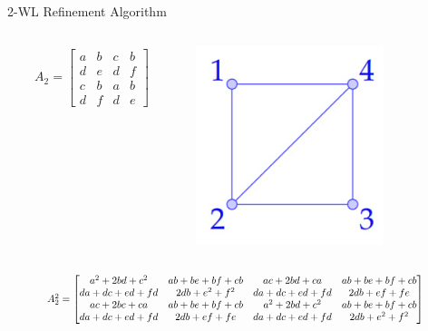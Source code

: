 \documentclass{beamer}
\begin{document}
\begin{frame}{2-WL Refinement Algorithm}
    \begin{columns}
        \begin{column}{0.7\textwidth}
        \begin{align*}
            A_2 = \begin{bmatrix}
                a&b&c&b\\
                d&e&d&f\\
                c&b&a&b\\
                d&f&d&e
            \end{bmatrix}
        \end{align*}
        \end{column}

        \begin{column}{0.3\textwidth}
            \centering
            \includegraphics[width=0.7\textwidth]{slides/pic_1.jpg}
        \end{column}
    \end{columns}
    
    \vspace{1em}
    \[
    \scalebox{0.8}{
    $
        A_2^2 = \begin{bmatrix}
            a^2+2bd+c^2 & ab+be+bf+cb&ac+2bd+ca & ab+be+bf+cb\\
            da+dc+ed+fd&2db+e^2+f^2&da+dc+ed+fd&2db+ef+fe\\
            ac+2bc+ca&ab+be+bf+cb&a^2+2bd+c^2&ab+be+bf+cb\\
            da+dc+ed+fd & 2db+ef+fe & da+dc+ed+fd & 2db+e^2+f^2
        \end{bmatrix}
    $
    }
    \]

\end{frame}
\end{document}
